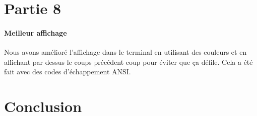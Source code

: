\documentclass[a4paper]{article}
\begin{document}
    \section{Partie 8}
    \paragraph{Meilleur affichage} Nous avons amélioré l'affichage dans le
    terminal en utilisant des couleurs et en affichant par dessus le coups
    précédent coup pour éviter que ça défile. Cela a été fait avec des codes
    d'échappement ANSI.

    \section{Conclusion}
\end{document}
